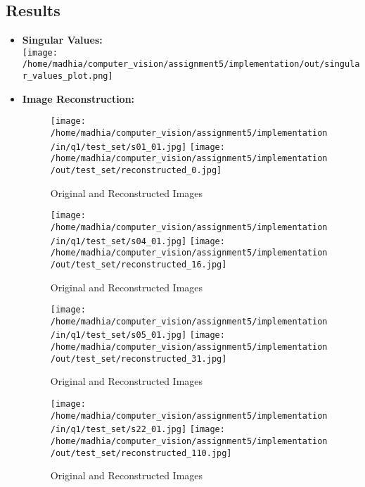 \documentclass{article}
\begin{document}
\subsection{Results}
    \begin{itemize}
        \item \textbf{Singular Values:} \\
        \texttt{[image: /home/madhia/computer\_vision/assignment5/implementation/out/singular\_values\_plot.png]} %

        \item \textbf{Image Reconstruction:} \\
        \begin{figure}[H]
            \centering
            \texttt{[image: /home/madhia/computer\_vision/assignment5/implementation/in/q1/test\_set/s01\_01.jpg]} %
            \texttt{[image: /home/madhia/computer\_vision/assignment5/implementation/out/test\_set/reconstructed\_0.jpg]} %
            \caption{Original and Reconstructed Images}
        \end{figure}

        \begin{figure}[H]
            \centering
            \texttt{[image: /home/madhia/computer\_vision/assignment5/implementation/in/q1/test\_set/s04\_01.jpg]} %
            \texttt{[image: /home/madhia/computer\_vision/assignment5/implementation/out/test\_set/reconstructed\_16.jpg]} %
            \caption{Original and Reconstructed Images}
        \end{figure}

        \begin{figure}[H]
            \centering
            \texttt{[image: /home/madhia/computer\_vision/assignment5/implementation/in/q1/test\_set/s05\_01.jpg]} %
            \texttt{[image: /home/madhia/computer\_vision/assignment5/implementation/out/test\_set/reconstructed\_31.jpg]} %
            \caption{Original and Reconstructed Images}
        \end{figure}

        \begin{figure}[H]
            \centering
            \texttt{[image: /home/madhia/computer\_vision/assignment5/implementation/in/q1/test\_set/s22\_01.jpg]} %
            \texttt{[image: /home/madhia/computer\_vision/assignment5/implementation/out/test\_set/reconstructed\_110.jpg]} %
            \caption{Original and Reconstructed Images}
        \end{figure}


\end{itemize}
\end{document}
